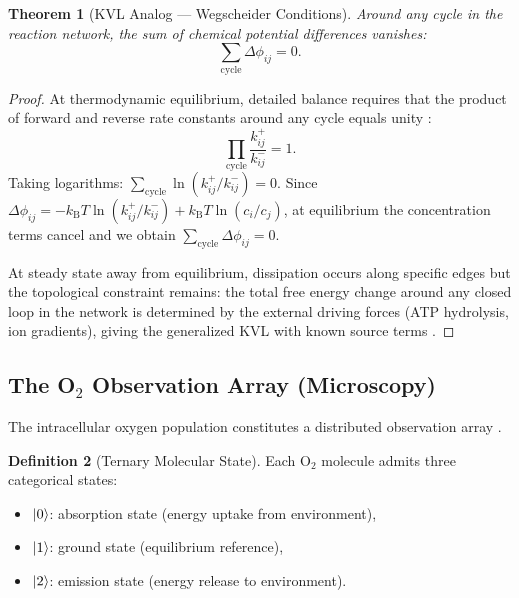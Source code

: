 \documentclass[twocolumn,10pt,a4paper]{article}
\newtheorem{theorem}{Theorem}[section]
\theoremstyle{definition}
\newtheorem{definition}[theorem]{Definition}
\theoremstyle{remark}
\newcommand{\kB}{k_{\mathrm{B}}}
\begin{document}
\begin{theorem}[KVL Analog --- Wegscheider Conditions]
\label{thm:KVL}
Around any cycle in the reaction network, the sum of chemical potential differences vanishes:
\begin{equation}
    \sum_{\text{cycle}} \Delta\phi_{ij} = 0.
    \label{eq:KVL}
\end{equation}
\end{theorem}

\begin{proof}
At thermodynamic equilibrium, detailed balance requires that the product of forward and reverse rate constants around any cycle equals unity \citep{Wegscheider1901}:
\begin{equation}
    \prod_{\text{cycle}} \frac{k_{ij}^+}{k_{ij}^-} = 1.
\end{equation}
Taking logarithms: $\sum_{\text{cycle}} \ln(k_{ij}^+/k_{ij}^-) = 0$. Since $\Delta\phi_{ij} = -\kB T \ln(k_{ij}^+/k_{ij}^-) + \kB T \ln(c_i/c_j)$, at equilibrium the concentration terms cancel and we obtain $\sum_{\text{cycle}} \Delta\phi_{ij} = 0$.

At steady state away from equilibrium, dissipation occurs along specific edges but the topological constraint remains: the total free energy change around any closed loop in the network is determined by the external driving forces (ATP hydrolysis, ion gradients), giving the generalized KVL with known source terms \citep{Onsager1931}.
\end{proof}

\subsection{The O\texorpdfstring{$_2$}{2} Observation Array (Microscopy)}
\label{sec:oxygen}

The intracellular oxygen population constitutes a distributed observation array \citep{Sachikonye2024e}.

\begin{definition}[Ternary Molecular State]
\label{def:ternary}
Each O$_2$ molecule admits three categorical states:
\begin{itemize}[nosep]
    \item $\ket{0}$: absorption state (energy uptake from environment),
    \item $\ket{1}$: ground state (equilibrium reference),
    \item $\ket{2}$: emission state (energy release to environment).
\end{itemize}
\end{definition}
\end{document}
